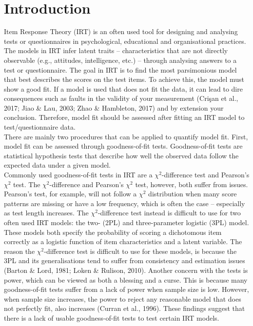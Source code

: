 \documentclass[Royal,sageapa,times,doublespace]{sagej}
\begin{document}

\maketitle

\section{Introduction}
Item Response Theory (IRT) is an often used tool for designing and analysing tests or questionnaires in psychological, educational and organisational practices. The models in IRT infer latent traits -- characteristics that are not directly observable (e.g., attitudes, intelligence, etc.) -- through analysing answers to a test or questionnaire. The goal in IRT is to find the most parsimonious model that best describes the scores on the test items. To achieve this, the model must show a good fit. If a model is used that does not fit the data, it can lead to dire consequences such as faults in the validity of your measurement (Cri\c{s}an et al., 2017; Jiao \& Lau, 2003; Zhao \& Hambleton, 2017) and by extension your conclusion. Therefore, model fit should be assessed after fitting an IRT model to test/questionnaire data. \\
\indent There are mainly two procedures that can be applied to quantify model fit. First, model fit can be assessed through goodness-of-fit tests. Goodness-of-fit tests are statistical hypothesis tests that describe how well the observed data follow the expected data under a given model. \\
\indent Commonly used goodness-of-fit tests in IRT are a $\chi^2$-difference test and Pearson's $\chi^2$ test. The $\chi^2$-difference and Pearson's $\chi^2$ test, however, both suffer from issues. Pearson's test, for example, will not follow a $\chi^2$ distribution when many score patterns are missing or have a low frequency, which is often the case -- especially as test length increases. The $\chi^2$-difference test instead is difficult to use for two often used IRT models: the two- (2PL) and three-parameter logistic (3PL) model. These models both specify the probability of scoring a dichotomous item correctly as a logistic function of item characteristics and a latent variable. The reason the $\chi^2$-difference test is difficult to use for these models, is because the 3PL and its generalisations tend to suffer from consistency and estimation issues (Barton \& Lord, 1981; Loken \& Rulison, 2010). Another concern with the tests is power, which can be viewed as both a blessing and a curse. This is because many goodness-of-fit tests suffer from a lack of power when sample size is low. However, when sample size increases, the power to reject any reasonable model that does not perfectly fit, also increases (Curran et al., 1996). These findings suggest that there is a lack of usable goodness-of-fit tests to test certain IRT models. \\
\end{document}
